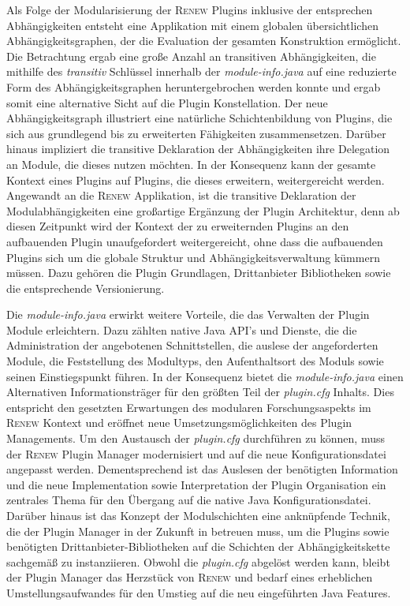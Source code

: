 Als Folge der Modularisierung der \textsc{Renew} Plugins inklusive der entsprechen Abhängigkeiten entsteht eine Applikation mit einem globalen übersichtlichen Abhängigkeitsgraphen, der die Evaluation der gesamten Konstruktion ermöglicht. Die Betrachtung ergab eine große Anzahl an transitiven Abhängigkeiten, die mithilfe des \textit{transitiv} Schlüssel innerhalb der \textit{module-info.java} auf eine reduzierte Form des Abhängigkeitsgraphen heruntergebrochen werden konnte und ergab somit eine alternative Sicht auf die Plugin Konstellation. Der neue Abhängigkeitsgraph illustriert eine natürliche Schichtenbildung von Plugins, die sich aus grundlegend bis zu erweiterten Fähigkeiten zusammensetzen. Darüber hinaus impliziert die transitive Deklaration der Abhängigkeiten ihre Delegation an Module, die dieses nutzen möchten. In der Konsequenz kann der gesamte Kontext eines Plugins auf Plugins, die dieses erweitern, weitergereicht werden. \newline
Angewandt an die \textsc{Renew} Applikation, ist die transitive Deklaration der Modulabhängigkeiten eine großartige Ergänzung der Plugin Architektur, denn ab diesen Zeitpunkt wird der Kontext der zu erweiternden Plugins an den aufbauenden Plugin unaufgefordert weitergereicht, ohne dass die aufbauenden Plugins sich um die globale Struktur und Abhängigkeitsverwaltung kümmern müssen. Dazu gehören die Plugin Grundlagen, Drittanbieter Bibliotheken sowie die entsprechende Versionierung.\bigbreak

Die \textit{module-info.java} erwirkt weitere Vorteile, die das Verwalten der Plugin Module erleichtern. Dazu zählten native Java API's und Dienste, die die Administration der angebotenen Schnittstellen, die auslese der angeforderten Module, die Feststellung des Modultyps, den Aufenthaltsort des Moduls sowie seinen Einstiegspunkt  führen. In der Konsequenz bietet die \textit{module-info.java} einen Alternativen Informationsträger für den größten Teil der \textit{plugin.cfg} Inhalts. Dies entspricht den gesetzten Erwartungen des modularen Forschungsaspekts im \textsc{Renew} Kontext und eröffnet neue Umsetzungsmöglichkeiten des Plugin Managements.\newline
Um den Austausch der \textit{plugin.cfg} durchführen zu können, muss der \textsc{Renew} Plugin Manager modernisiert und auf die neue Konfigurationsdatei angepasst werden. Dementsprechend ist das Auslesen der benötigten Information und die neue Implementation sowie Interpretation der Plugin Organisation ein zentrales Thema für den Übergang auf die native Java Konfigurationsdatei. Darüber hinaus ist das Konzept der Modulschichten eine anknüpfende Technik, die der Plugin Manager in der Zukunft in betreuen muss, um die Plugins sowie benötigten Drittanbieter-Bibliotheken auf die Schichten der Abhängigkeitskette sachgemäß zu instanziieren.\newline
Obwohl die \textit{plugin.cfg} abgelöst werden kann, bleibt der Plugin Manager das Herzstück von \textsc{Renew} und bedarf eines erheblichen Umstellungsaufwandes für den Umstieg auf die neu eingeführten Java Features.\bigbreak

